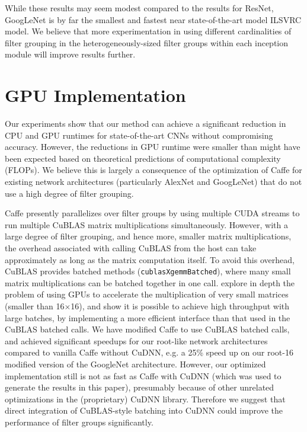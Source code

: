 \documentclass[thesis]{subfiles}
\begin{document}
	While these results may seem modest compared to the results for ResNet, GoogLeNet is by far the smallest and fastest near state-of-the-art model ILSVRC model. We believe that more experimentation in using different cardinalities of filter grouping in the heterogeneously-sized filter groups within each inception module will improve results further.
	
	\section{GPU Implementation}
	\label{gpuexplanation}
	Our experiments show that our method can achieve a significant reduction in CPU and GPU runtimes for state-of-the-art CNNs without compromising accuracy. However, the reductions in GPU runtime were smaller than might have been expected based on theoretical predictions of computational complexity (FLOPs). We believe this is largely a consequence of the optimization of Caffe for existing network architectures (particularly AlexNet and GoogLeNet) that do not use a high degree of filter grouping.
	
	Caffe presently parallelizes over filter groups by using multiple CUDA streams to run multiple CuBLAS matrix multiplications simultaneously. However, with a large degree of filter grouping, and hence more, smaller matrix multiplications, the overhead associated with calling CuBLAS from the host can take approximately as long as the matrix computation itself. To avoid this overhead, CuBLAS provides batched methods (\eg \texttt{cublasXgemmBatched}), where many small matrix multiplications can be batched together in one call. \citet{Jhurani2015} explore in depth the problem of using GPUs to accelerate the multiplication of very small matrices (smaller than 16$\times$16), and show it is possible to achieve high throughput with large batches, by implementing a more efficient interface than that used in the CuBLAS batched calls.
	We have modified Caffe to use CuBLAS batched calls, and achieved significant speedups for our  root-like network architectures compared to vanilla Caffe without CuDNN, e.g. a 25\% speed up on our root-16 modified version of the GoogleNet architecture. However, our optimized implementation still is not as fast as Caffe with CuDNN (which was used to generate the results in this paper), presumably because of other unrelated optimizations in the (proprietary) CuDNN library. Therefore we suggest that direct integration of CuBLAS-style batching into CuDNN could improve the performance of filter groups significantly.
	
\end{document}
